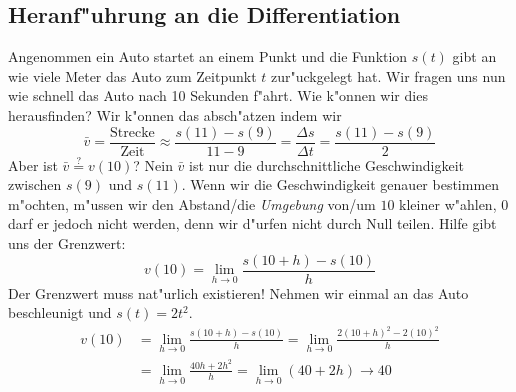 \subsection{Heranf"uhrung an die Differentiation}
Angenommen ein Auto startet an einem Punkt und die Funktion $s(t)$ gibt an wie viele Meter das Auto zum Zeitpunkt $t$ zur"uckgelegt hat. Wir fragen uns nun wie schnell das Auto nach 10 Sekunden f"ahrt. Wie k"onnen wir dies herausfinden? Wir k"onnen das absch"atzen indem wir 
\begin{equation*}
\bar{v} = \frac{\text{Strecke}}{\text{Zeit}} \approx \frac{s(11) - s(9)}{11 - 9} = \frac{\Delta s}{\Delta t} = \frac{s(11) - s(9)}{2}
\end{equation*}
Aber ist $\bar{v} \stackrel{?}{=} v(10)$? Nein $\bar{v}$ ist nur die durchschnittliche Geschwindigkeit zwischen $s(9)$ und $s(11)$. Wenn wir die Geschwindigkeit genauer bestimmen m"ochten, m"ussen wir den Abstand/die \textit{Umgebung} von/um $10$ kleiner w"ahlen, $0$ darf er jedoch nicht werden, denn wir d"urfen nicht durch Null teilen. Hilfe gibt uns der Grenzwert:
\begin{equation*}
v(10) = \lim\limits_{h \to 0} \frac{s(10+h) - s(10)}{h}
\end{equation*}
Der Grenzwert muss nat"urlich existieren! Nehmen wir einmal an das Auto beschleunigt und $s(t) = 2 t^2$.
\begin{align*}
v(10) &= \lim\limits_{h \to 0} \frac{s(10+h) - s(10)}{h} = \lim\limits_{h \to 0} \frac{2 (10+h)^2 - 2 (10)^2}{h}\\
&= \lim\limits_{h \to 0} \frac{40h + 2h^2}{h} = \lim\limits_{h \to 0}(40 + 2h) \to 40
\end{align*}

